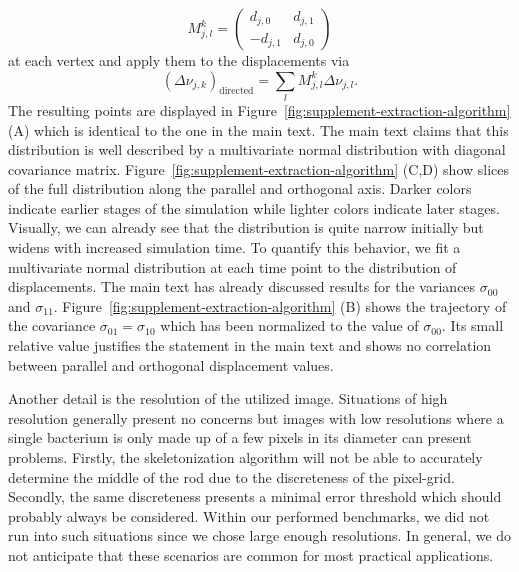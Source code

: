 \begin{equation}
    M_{j,l}^k = \begin{pmatrix}
        d_{j,0} & d_{j,1}\\
        -d_{j,1} & d_{j,0}
    \end{pmatrix}
\end{equation}
at each vertex and apply them to the displacements via
\begin{equation}
    (\Delta\nu_{j,k})_\text{directed} = \sum\limits_l M_{j,l}^k \Delta\nu_{j,l}.
\end{equation}
The resulting points are displayed in Figure~\ref{fig:supplement-extraction-algorithm} (A) which is
identical to the one in the main text.
The main text claims that this distribution is well described by a multivariate normal distribution
with diagonal covariance matrix.
Figure~\ref{fig:supplement-extraction-algorithm} (C,D) show slices of the full distribution along
the parallel and orthogonal axis.
Darker colors indicate earlier stages of the simulation while lighter colors indicate later stages.
Visually, we can already see that the distribution is quite narrow initially but widens with
increased simulation time.
To quantify this behavior, we fit a multivariate normal distribution at each time point to the
distribution of displacements.
The main text has already discussed results for the variances $\sigma_{00}$ and $\sigma_{11}$.
Figure~\ref{fig:supplement-extraction-algorithm} (B) shows the trajectory of the covariance
$\sigma_{01}=\sigma_{10}$ which has been normalized to the value of $\sigma_{00}$.
Its small relative value justifies the statement in the main text and shows no correlation between
parallel and orthogonal displacement values.

Another detail is the resolution of the utilized image.
Situations of high resolution generally present no concerns but images with low resolutions where a
single bacterium is only made up of a few pixels in its diameter can present problems.
Firstly, the skeletonization algorithm will not be able to accurately determine the middle of the
rod due to the discreteness of the pixel-grid.
Secondly, the same discreteness presents a minimal error threshold which should probably always be
considered.
Within our performed benchmarks, we did not run into such situations since we chose large enough
resolutions.
In general, we do not anticipate that these scenarios are common for most practical applications.

